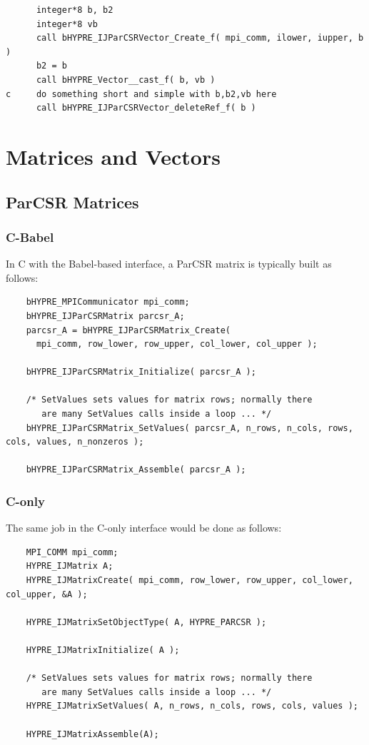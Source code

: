 \begin{verbatim}
      integer*8 b, b2
      integer*8 vb
      call bHYPRE_IJParCSRVector_Create_f( mpi_comm, ilower, iupper, b )
      b2 = b
      call bHYPRE_Vector__cast_f( b, vb )
c     do something short and simple with b,b2,vb here
      call bHYPRE_IJParCSRVector_deleteRef_f( b )
\end{verbatim}



\section{Matrices and Vectors}

\subsection{ParCSR Matrices}

\subsubsection{C-Babel}
In C with the Babel-based interface, a ParCSR matrix is typically built as follows:

\begin{verbatim}
    bHYPRE_MPICommunicator mpi_comm;
    bHYPRE_IJParCSRMatrix parcsr_A;
    parcsr_A = bHYPRE_IJParCSRMatrix_Create(
      mpi_comm, row_lower, row_upper, col_lower, col_upper );

    bHYPRE_IJParCSRMatrix_Initialize( parcsr_A );

    /* SetValues sets values for matrix rows; normally there
       are many SetValues calls inside a loop ... */
    bHYPRE_IJParCSRMatrix_SetValues( parcsr_A, n_rows, n_cols, rows, cols, values, n_nonzeros );

    bHYPRE_IJParCSRMatrix_Assemble( parcsr_A );
\end{verbatim}

\subsubsection{C-only}
The same job in the C-only interface would be done as follows:

\begin{verbatim}
    MPI_COMM mpi_comm;
    HYPRE_IJMatrix A;
    HYPRE_IJMatrixCreate( mpi_comm, row_lower, row_upper, col_lower, col_upper, &A );

    HYPRE_IJMatrixSetObjectType( A, HYPRE_PARCSR );

    HYPRE_IJMatrixInitialize( A );

    /* SetValues sets values for matrix rows; normally there
       are many SetValues calls inside a loop ... */
    HYPRE_IJMatrixSetValues( A, n_rows, n_cols, rows, cols, values );

    HYPRE_IJMatrixAssemble(A);
\end{verbatim}


